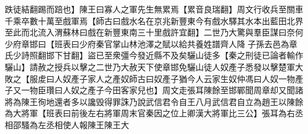 跌徒結翻踢而踣也】陳王曰寡人之軍先生無累焉【累音良瑞翻】周文行收兵至關車千乘卒數十萬至戲軍焉【師古曰戲水名在京兆新豐東今有戲水驛其水本出藍田北界至此而北流入渭蘇林曰戲在新豐東南三十里戲許宜翻】二世乃大驚與羣臣謀曰奈何少府章邯曰【班表曰少府秦官掌山林池澤之賦以給共養姓譜齊人降子孫去邑為章氏少詩照翻邯下甘翻】盜已至衆彊今發近縣不及矣驪山徒多【秦之刑徒已論者輸作驪山】請赦之授兵以擊之二世乃大赦天下使章邯免驪山徒人奴產子悉發以擊楚軍大敗之【服䖍曰人奴產子家人之產奴師古曰奴產子猶今人云家生奴仲馮曰人奴一物產子又一物臣瓚曰人奴之產子今田客家兒也】周文走張耳陳餘至邯鄲聞周章却又聞諸將為陳王徇地還者多以讒毁得罪誅乃說武信君令自王八月武信君自立為趙王以陳餘為大將軍【班表曰前後左右將軍周末官秦因之位上卿漢大將軍比三公】張耳為右丞相邵騷為左丞相使人報陳王陳王大